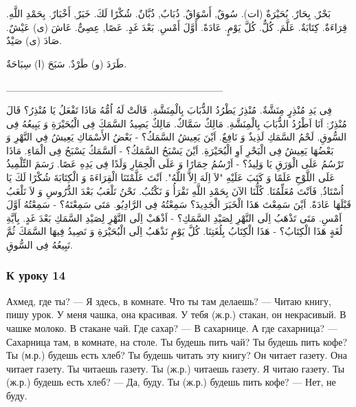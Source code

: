 \documentclass[a5paper]{article}
\begin{document}
بَحْرٌ, بِحَارٌ. بُحَيْرَةٌ (ات). سُوقٌ, أَسْوَاقٌ. ذُبَابٌ, ذُبَّانٌ. شُكْرًا لَكَ. خَبَرٌ, أَخْبَارٌ. بِحَمْدِ اللَّهِ. قِرَاءَةٌ. كِتَابَةٌ. عَلَّمَ. كُلٌّ. كُلَّ يَوْمٍ. عَادَةً. أَوَّلَ أَمْسِ. بَعْدَ غَدٍ. عَصًا, عِصِىٌّ. عَاشَ (ى) عَيْشٌ. صَادَ (ى) صَيْدٌ.

طَرَدَ (و) طَرْدٌ. سَبَحَ (ا) سِبَاحَةٌ.

\_\_\_\_\_\_\_\_\_\_\_\_\_\_\_\_\_\_\_\_\_\_\_\_\_\_\_\_\_\_

فِى يَدِ مُنْذِرٍ مِنَشَّةٌ. مُنْذِرُ يَطْرُدُ الذُّبَابَ بِالْمِنَشَّةِ. قَالَتْ لَهُ اُمُّهُ مَاذَا تَفْعَلُ يَا مُنْذِرُ؟ قَالَ مُنْذِرٌ: اَنَا اَطْرُدُ الذُّبَابَ بِالْمِنَشَّةِ. مَالِكٌ سَمَّاكٌ. مَالِكٌ يَصِيدُ السَّمَكَ فِى الْبُحَيْرَةِ وَ يَبِيعُهُ فِى السُّوقِ. لَحْمُ السَّمَكِ لَذِيذٌ وَ نَافِعٌ. اَيْنَ يَعِيشُ السَّمَكُ؟ - بَعْضُ الأَسْمَاكِ يَعِيشُ فِي النَّهْرِ وَ بَعْضُهَا يَعِيشُ فِى الْبَحْرِ اَوِ الْبُحَيْرَةِ. اَيْنَ يَسْبَحُ السَّمَكُ؟ - اَلسَّمَكُ يَسْبَحُ فِى الْمَاءِ. مَاذَا تَرْسُمُ عَلَى الْوَرَقِ يَا وَلِيدُ؟ - اَرْسُمُ حِمَارًا وَ عَلَى الْحِمَارِ وَلَدًا فِى يَدِهِ عَصًا. رَسَمَ التِّلْمِيذُ عَلَى اللَّوْحِ عَلَمًا وَ كَتَبَ عَلَيْهِ "لاَ اِلَهَ اِلاَّ اللَّهُ". اَنْتَ عَلَّمْتَنَا الْقِرَاءَةَ وَ الْكِتَابَةَ شُكْرًا لَكَ يَا اُسْتَاذُ, فَاَنْتَ مُعَلِّمُنَا. كُلُّنَا الآنَ بِحَمْدِ اللَّهِ نَقْرَأُ وَ نَكْتُبُ. نَحْنُ نَلْعَبُ بَعْدَ الدُّرُوسِ وَ لاَ نَلْعَبُ قَبْلَهَا عَادَةً. اَيْنَ سَمِعْتَ هَذَا الْخَبَرَ الْجَدِيدَ؟ سَمِعْتُهُ فِى الرَّادِيُو. مَتَى سَمِعْتَهُ؟ - سَمِعْتُهُ اَوَّلَ اَمْسِ. مَتَى تَذْهَبُ اِلَى النَّهْرِ لِصَيْدِ السَّمَكِ؟ - اَذْهَبْ اِلَى النَّهْرِ لِصَيْدِ السَّمَكِ بَعْدَ غَدٍ. بِاَيَّةِ لُغَةٍ هَذَا الْكِتَابُ؟ - هَذَا الْكِتَابُ بِلُغَتِنَا. كُلَّ يَوْمٍ نَذْهَبُ اِلَى الْبُحَيْرَةِ وَ نَصِيدُ فِيهَا السَّمَكَ ثُمَّ نَبِيعُهُ فِى السُّوقِ.

\subsubsection[К уроку 14]{К уроку 14}
Ахмед, где ты? — Я здесь, в комнате. Что ты там делаешь? — Читаю книгу, пишу урок. У меня чашка, она красивая. У тебя (ж.р.) стакан, он некрасивый. В чашке молоко. В стакане чай. Где сахар? — В сахарнице. А где сахарница? — Сахарница там, в комнате, на столе. Ты будешь пить чай? Ты будешь пить кофе? Ты (м.р.) будешь есть хлеб? Ты будешь читать эту книгу? Он читает газету. Она читает газету. Ты читаешь газету. Ты (ж.р.) читаешь газету. Я читаю газету. Ты (ж.р.) будешь есть хлеб? — Да, буду. Ты (ж.р.) будешь пить кофе? — Нет, не буду.
\end{document}
